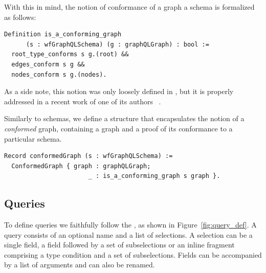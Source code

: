 With this in mind, the notion of conformance of a graph \wrt a schema is formalized as follows:
%
\begin{verbatim}
Definition is_a_conforming_graph 
      (s : wfGraphQLSchema) (g : graphQLGraph) : bool :=
  root_type_conforms s g.(root) &&
  edges_conform s g &&
  nodes_conform s g.(nodes).
\end{verbatim}
%
As a side note, this notion was only loosely defined in \HP, but it is properly addressed in a recent work of one of its authors ~\cite{olafschema}.

Similarly to \gql schemas, we define a structure that encapsulates the notion of a \textit{conformed} graph, containing a graph and a proof of its conformance to a particular schema.

\begin{verbatim}
Record conformedGraph (s : wfGraphQLSchema) :=
  ConformedGraph { graph : graphQLGraph;
                       _ : is_a_conforming_graph s graph }.
\end{verbatim}




\subsection{Queries}\label{subsec:query}
To define queries we faithfully follow the \spec, as shown in Figure~\ref{fig:query_def}. A query consists of an optional name and a list of selections. A selection can be a single field, a field followed by a set of subselections or an inline fragment comprising a type condition and a set of subselections. Fields can be accompanied by a list of arguments and can also be renamed.

